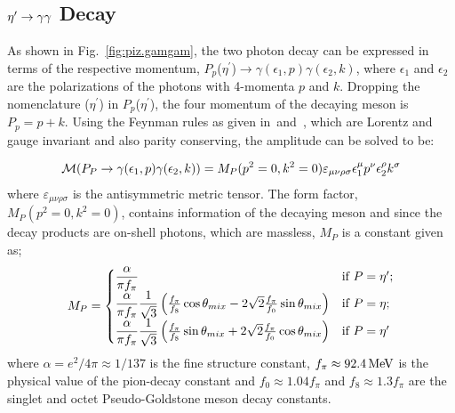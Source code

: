 \subsection{$\eta^{\prime} \to \gamma \gamma$  Decay}\label{sec:piz.gg}
As shown in Fig.~\ref{fig:piz.gamgam}, the two photon decay can be expressed in terms of the respective momentum, $P_p$($\eta^{\prime}$)$\to \gamma(\epsilon_1,p) \gamma(\epsilon_2,k)$, where $\epsilon_1$ and $\epsilon_2$ are the polarizations of the photons with 4-momenta $p$ and $k$. Dropping the nomenclature ($\eta^{\prime}$) in $P_p$($\eta^{\prime}$), the four momentum of the decaying meson is $P_p= p+k$. Using the Feynman rules as given in~\cite{peskin}and~\cite{halzen}, which are Lorentz and gauge invariant and also parity conserving, the amplitude can be solved to be:

\begin{align}\label{eq:piz.gg.amp}
 {\cal M}(P_P \to \gamma(\epsilon_1,p) \gamma(\epsilon_2,k))= {M}_P(p^2=0,k^2=0) \varepsilon_{\mu\nu\rho\sigma}\epsilon_1^\mu p^\nu \epsilon_2^\rho k^\sigma
\end{align}
where $\varepsilon_{\mu\nu\rho\sigma}$ is the antisymmetric metric tensor. The form factor, ${M}_P(p^2=0,k^2=0)$, contains information of the decaying meson and since the decay products are on-shell photons, which are massless, ${M}_P$ is a constant given as;
\begin{align}\label{eq:decay.constants}
 {M}_P=\begin{cases}
         {\displaystyle\frac{\alpha}{\pi f_{\pi}}} & \mbox{if $P=\eta^{\prime}$};\\
        {\displaystyle\frac{\alpha}{\pi f_\pi} \frac{1}{\sqrt{3}} }\left( \frac{f_\pi}{f_8} \cos\theta_{mix} -2\sqrt{2} \frac{f_\pi}{f_0} \sin\theta_{mix} \right)& \mbox{if $P=\eta$};\\
        {\displaystyle\frac{\alpha}{\pi f_\pi} \frac{1}{\sqrt{3}}} \left( \frac{f_\pi}{f_8} \sin\theta_{mix} +2\sqrt{2} \frac{f_\pi}{f_0} \cos\theta_{mix} \right)& \mbox{if $P=\eta'$} \,
\end{cases}
\end{align}
where $\alpha=e^2/4\pi \approx 1/137$ is the fine structure constant, $f_\pi \approx 92.4 \,{\rm MeV}$ is the physical value of the pion-decay constant and $f_0 \approx 1.04 f_\pi$ and $f_8 \approx 1.3 f_\pi$ are the singlet and octet Pseudo-Goldstone meson decay constants.

